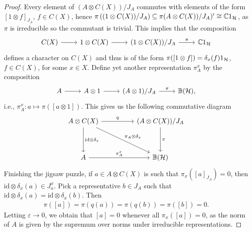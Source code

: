 \begin{proof}
	Every element of $(A \otimes C(X))/J_A$ commutes with elements of the form $[1 \otimes f]_{J_A}$, $f \in C(X)$, hence $\pi\left( (1 \otimes C(X))/J_A \right) \subseteq \pi(A \otimes C(X))/J_A)' \cong  \mathbb{C} 1_{\mathcal{H}}$, as $\pi$ is irreducible so the commutant is trivial. This implies that the composition
	\begin{equation*}
		\begin{tikzcd}
			 C(X) \ar[r] & 1 \otimes C(X) \ar[r] & (1 \otimes C(X))/J_A \ar[r, "\pi"] & \C 1_\H 
		\end{tikzcd}
	\end{equation*}
	defines a character on $C(X)$ and thus is of the form $\pi([1 \otimes f]) = \delta_x(f)1_{\mathcal{H}}$, $f \in C(X)$, for some $x \in X$. Define yet another representation $\pi_A^x$ by the composition 
	\begin{equation*}
		\begin{tikzcd}
			A \ar[r] &A \otimes 1  \ar[r] & (A \otimes 1)/J_A \ar[r, "\pi"] & \mathbb{B}(\H),
		\end{tikzcd}
	\end{equation*}
	i.e., $\pi_A^x \colon a \mapsto \pi([a \otimes 1])$. This gives us the following commutative diagram
	\begin{equation*}
		\begin{tikzcd}
			A \otimes C(X) \ar[rr, "q"] \ar [dd, "\mathrm{id}\otimes \delta_x"] \ar[rrdd, "\pi_A \otimes \delta_x"] && (A \otimes C(X))/J_A \ar[dd, "\pi"]\\ 
			 & & \\
			A \ar[rr, "\pi_A^x"] && \mathbb{B}(\H)
		\end{tikzcd}
	\end{equation*}
	Finishing the jigsaw puzzle, if $a \in A \otimes C(X)$ is such that $\pi_x([a]_{J_A})=0$, then $\mathrm{id} \otimes \delta_x (a) \in J_a^x$. Pick a representative $b \in J_A$ such that $\mathrm{id} \otimes \delta_x (a) = \mathrm{id} \otimes \delta_x (b)$. Then
	\begin{align*}
		\pi([a]) = \pi( q(a)) =  \pi(q(b)) = \pi([b])=0.
	\end{align*}
	Letting $\varepsilon \to 0$, we obtain that $[a] = 0$ whenever all $\pi_x([a]) = 0$, as the norm of $A$ is given by the supremum over norms under irreducible representations. 
	

\end{proof}
